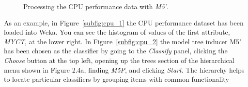 \begin{figure}[!ht]
\centering
{}
\newline
{}
\caption{\label{fig:cpu_m5}Processing the CPU performance data with \textit{M5'}.}
\end{figure}

As an example, in Figure~\ref{subfig:cpu_1} the CPU performance
dataset has been loaded into Weka. You can see the histogram of values
of the first attribute, \textit{MYCT}, at the lower right. In
Figure~\ref{subfig:cpu_2} the model tree inducer M5' has been chosen
as the classifier by going to the \textit{Classify} panel, clicking
the \textit{Choose} button at the top left, opening up the trees
section of the hierarchical menu shown in Figure 2.4a, finding
\textit{M5P}, and clicking \textit{Start}. The hierarchy helps to
locate particular classifiers by grouping items with common
functionality

